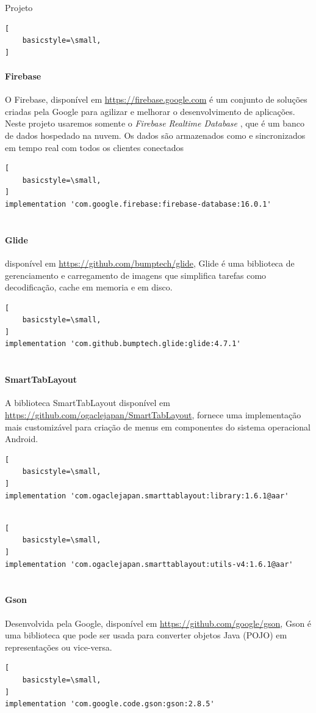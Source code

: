 \documentclass[
	12pt,				%
	openright,			%
	twoside,			%
	a4paper,			%
	english,			%
	french,				%
	spanish,			%
	brazil				%
	]{abntex2}
\begin{document}
\begin{chapter}{Projeto}
\begin{lstlisting}[
    basicstyle=\small,
]
\end{lstlisting}
   \paragraph{Firebase}
O Firebase, disponível em \url{https://firebase.google.com} é um conjunto de soluções criadas pela Google para agilizar e melhorar o desenvolvimento de aplicações. Neste projeto usaremos somente o \textit{Firebase Realtime Database} , que é um banco de dados hospedado na nuvem. Os dados são armazenados como  e sincronizados em tempo real com todos os clientes conectados
        \begin{lstlisting}[
    basicstyle=\small,
]
implementation 'com.google.firebase:firebase-database:16.0.1'
  
\end{lstlisting}

   \paragraph{Glide}
   disponível em \url{https://github.com/bumptech/glide}, Glide é uma biblioteca de gerenciamento e carregamento de imagens 
que simplifica tarefas como decodificação, cache em memoria e em disco. 
        \begin{lstlisting}[
    basicstyle=\small,
]
implementation 'com.github.bumptech.glide:glide:4.7.1'
  
\end{lstlisting}
   \paragraph{SmartTabLayout}
   A biblioteca SmartTabLayout disponível em \url{https://github.com/ogaclejapan/SmartTabLayout}, fornece uma implementação mais customizável 
para criação de menus em componentes do sistema operacional Android.
         \begin{lstlisting}[
    basicstyle=\small,
]
implementation 'com.ogaclejapan.smarttablayout:library:1.6.1@aar'
   
\end{lstlisting}
        \begin{lstlisting}[
    basicstyle=\small,
]
implementation 'com.ogaclejapan.smarttablayout:utils-v4:1.6.1@aar'
   
\end{lstlisting}
   \paragraph{Gson}
   Desenvolvida pela Google, disponível em \url{https://github.com/google/gson}, Gson é uma biblioteca que pode ser usada para converter objetos Java (POJO) em representações  ou vice-versa.
         \begin{lstlisting}[
    basicstyle=\small,
]
implementation 'com.google.code.gson:gson:2.8.5'
    

\end{lstlisting}
\end{chapter}
\end{document}
